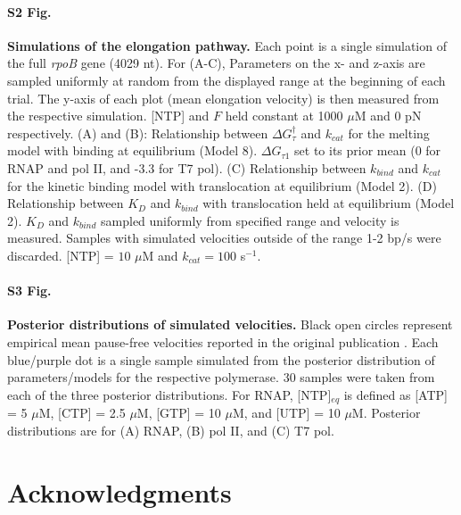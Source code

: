 \documentclass[10pt,letterpaper]{article}
\begin{document}
\paragraph*{S2 Fig.}
\label{S2_Fig}
{{\bf Simulations of the elongation pathway.} Each point is a single simulation of the full \textit{rpoB} gene (4029 nt). For (A-C), Parameters on the x- and z-axis are sampled uniformly at random from the displayed range at the beginning of each trial. The y-axis of each plot (mean elongation velocity) is then measured from the respective simulation. [NTP] and $F$ held constant at 1000 $\mu$M and 0 pN respectively. (A) and (B): Relationship between $\Delta G^\dag_{\tau}$ and $k_{cat}$ for the melting model with binding at equilibrium (Model 8). $\Delta G_{\tau 1}$ set to its prior mean (0 for RNAP and pol II, and -3.3 for T7 pol). (C) Relationship between $k_{bind}$ and $k_{cat}$ for the kinetic binding model with translocation at equilibrium (Model 2). (D) Relationship between $K_D$ and $k_{bind}$ with translocation held at equilibrium (Model 2). $K_D$ and $k_{bind}$ sampled uniformly from specified range and velocity is measured. Samples with simulated velocities outside of the range 1-2 bp/s were discarded. [NTP] = $10$ $\mu$M and $k_{cat} = 100$ s$^{-1}$.





\paragraph*{S3 Fig.}
\label{S3_Fig}
{{\bf Posterior distributions of simulated velocities.} Black open circles represent empirical mean pause-free velocities reported in the original publication \cite{abbondanzieri2005direct,schweikhard2014transcription,thomen2008t7}. Each blue/purple dot is a single sample simulated from the posterior distribution of parameters/models for the respective polymerase. 30 samples were taken from each of the three posterior distributions. For RNAP, [NTP]$_{eq}$ is defined as [ATP] = 5 $\mu$M, [CTP] = 2.5 $\mu$M, [GTP] = 10 $\mu$M, and [UTP] = 10 $\mu$M. Posterior distributions are for (A) RNAP,  (B) pol II, and (C) T7 pol. 





\section*{Acknowledgments}

}}
\end{document}
